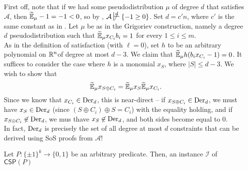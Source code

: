 First off, note that if we had some pseudodistribution $\mu$ of degree $d$ that satisfies $\mathcal{A}$, then $\widetilde{\mathbb{E}}_\mu -1 = -1 < 0$, so by , $\mathcal{A} \not\sststile{}{d} \{-1 \ge 0\}$. Set $d = c'n$, where $c'$ is the same constant as in . Let $\mu$ be as in the Grigoriev construction, namely a degree $d$ pseudodistribution such that $\widetilde{\mathbb{E}}_\mu x_{C_i} b_i = 1$ for every $1 \le i \le m$.\\
As in the definition of satisfaction  (with $\ell = 0$), set $h$ to be an arbitrary polynomial on $\mathbb{R}^n$of degree at most $d-3$. We claim that $\widetilde{\mathbb{E}}_\mu h (b_i x_{C_i} - 1) = 0$. It suffices to consider the case where $h$ is a monomial $x_S$, where $|S| \le d-3$. We wish to show that
\[ \widetilde{\mathbb{E}}_\mu x_{S \oplus C_i} = \widetilde{\mathbb{E}}_\mu x_S \widetilde{\mathbb{E}}_\mu x_{C_i}. \]
Since we know that $x_{C_i} \in \operatorname{Der}_d$, this is near-direct -- if $x_{S \oplus C_i} \in \operatorname{Der}_d$, we must have $x_S \in \operatorname{Der}_d$ (since $(S \oplus C_i) \oplus S = C_i$) with the equality holding, and if $x_{S \oplus C_i} \not\in \operatorname{Der}_d$, we mus thave $x_S \not\in \operatorname{Der}_d$, and both sides  become equal to $0$.\\

In fact, $\operatorname{Der}_d$ is precisely the set of all degree at most $d$ constraints that can be derived using SoS proofs from $\mathcal{A}$!\\

\begin{fdef}
	Let $P : \{\pm1\}^k \to \{0,1\}$ be an arbitrary predicate. Then, an instance $\mathcal{I}$ of $\mathsf{CSP}(P)$
\end{fdef}